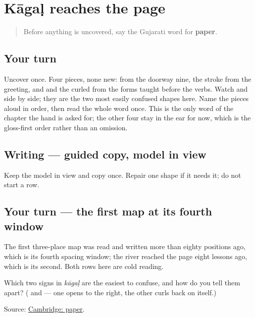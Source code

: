 \section[Practice]{Kāgaḷ reaches the page}

\label{lesson:GU-C30-kaagal}



\begin{quote}
Before anything is uncovered, say the Gujarati word for \textbf{paper}.
\end{quote}

\subsection*{Your turn}
Uncover \textbf{} once. Four pieces, none new: \textbf{} from the doorway nine, the \textbf{} stroke from the greeting, and \textbf{} and the curled \textbf{} from the forms taught before the verbs. Watch \textbf{} and \textbf{} side by side; they are the two most easily confused shapes here. Name the pieces aloud in order, then read the whole word once. This is the only word of the chapter the hand is asked for; the other four stay in the ear for now, which is the gloss-first order rather than an omission.

\subsection*{Writing — guided copy, model in view}
Keep the model in view and copy \textbf{} once. Repair one shape if it needs it; do not start a row.

\subsection*{Your turn — the first map at its fourth window}
The first three-place map was read and written more than eighty positions ago, which is its fourth spacing window; the river reached the page eight lessons ago, which is its second. Both rows here are cold reading.

\begin{tcolorbox}[breakable,colback=teal!4,colframe=teal!35!black,title={Before you move on}]
Which two signs in \emph{kāgaḷ} are the easiest to confuse, and how do you tell them apart? (\textbf{} and \textbf{} — one opens to the right, the other curls back on itself.)

Source: \href{https://dictionary.cambridge.org/dictionary/english-gujarati/paper}{Cambridge: paper}.
\end{tcolorbox}
